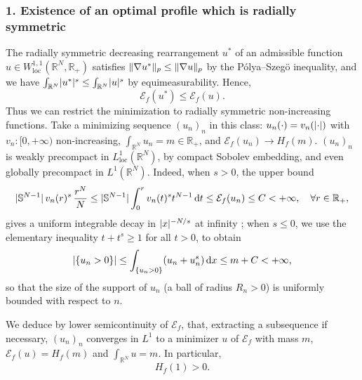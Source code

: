 \documentclass[JEP,XML,SOM,Unicode,published]{cedram}
\theoremstyle{plain}
\theoremstyle{definition}
\newcommand{\dd}{\mathop{}\mathopen{}\mathrm{d}}
\newcommand{\R}{\mathbb{R}}
\newcommand{\ener}{\mathcal{E}}
\newcommand{\loc}{\mathrm{loc}}
\DeclarePairedDelimiter{\abs}{\lvert}{\rvert}
\DeclarePairedDelimiter{\norm}{\lVert}{\rVert}
\begin{document}
\subsubsection*{\textup{1}. Existence of an optimal profile which is radially symmetric} The radially symmetric decreasing rearrangement $u^*$ of an admissible function $u\in W^{1,1}_{\loc}(\R^N,\R_+)$ satisfies $\norm{\nabla u^*}_p\leq\norm{\nabla u}_p$ by the Pólya–Szegö inequality, and we have $\int_{\R^N}\abs{u^*}^s\leq\int_{\R^N}\abs{u}^s$ by equimeasurability. Hence,
\[\ener_f(u^*)\leq\ener_f(u).\]
Thus we can restrict the minimization to radially symmetric non-increasing functions. Take a minimizing sequence $(u_n)_n$ in this class: $u_n(\cdot)=v_n(\abs{\cdot})$ with $v_n:[0,+\infty)$ non-increasing, $\int_{\R^N}u_n=m\in\R_+$, and $\ener_f(u_n)\to H_f(m)$. $(u_n)_n$ is weakly precompact in $L^1_{\loc}(\R^N)$, by compact Sobolev embedding, and even globally precompact in $L^1(\R^N)$. Indeed, when $s > 0$, the upper bound
\[\abs{\mathbb{S}^{N-1}}\,v_n(r)^s\, \frac{r^N}N\leq \abs{\mathbb{S}^{N-1}}\int_0^r v_n(t)^s t^{N-1}\dd t\leq\ener_f(u_n)\leq C<+\infty,\quad\forall r\in\R_+,\]
gives a uniform integrable decay in $\abs{x}^{-N/s}$ at infinity ; when $s\leq 0$, we use the elementary inequality $t+t^s\geq 1$ for all $t>0$, to obtain\vspace*{-3pt}
\begin{equation}
\label{compatnessSupport}
\abs{\{u_n>0\}}\leq \int_{\{u_n>0\}} (u_n+ u_n^s) \dd x\leq m+C<+\infty,
\end{equation}
so that the size of the support of $u_n$ (a ball of radius $R_n>0$) is uniformly bounded with respect to $n$.

We deduce by lower semicontinuity of $\ener_f$, that, extracting a subsequence if necessary, $(u_n)_n$ converges in $L^1$ to a minimizer $u$ of $\ener_f$ with mass $m$, \ie $\ener_f(u)=H_f(m)$ and $\int_{\R^N}u=m$. In particular,\vspace*{-3pt}\enlargethispage{\baselineskip}
\[
H_f(1)>0.
\]
\end{document}
